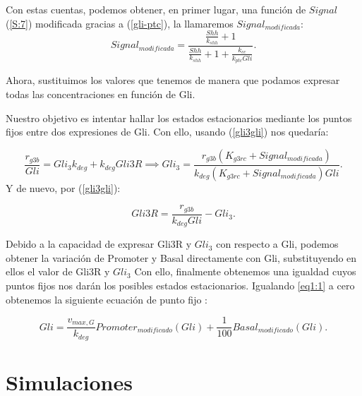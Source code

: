 Con estas cuentas, podemos obtener, en primer lugar, una función de $Signal$ (\ref{S:7}) modificada gracias a (\ref{gli-ptc}), la llamaremos $Signal_{modificada}$:
\begin{equation}
Signal_{modificada}=\frac{\frac{Shh}{k_{shh}} + 1}{\frac{Shh}{k_{shh}} + 1 + \frac{k_{cc}}{k_{ptc}Gli}}.
\end{equation}

Ahora, sustituimos los valores que tenemos de manera que podamos expresar todas las concentraciones en función de Gli. 

Nuestro objetivo es intentar hallar los estados estacionarios mediante los puntos fijos entre dos expresiones de Gli. Con ello, usando (\ref{gli3gli}) nos quedaría:

\begin{equation}
 \frac{r_{g3b}}{Gli}=Gli_3k_{deg}+k_{deg}Gli3R
 \implies Gli_3=\frac{r_{g3b}(K_{g3rc}+Signal_{modificada})}{k_{deg}(K_{g3rc}+Signal_{modificada})Gli}.
\label{equgli3}
\end{equation}
 Y de nuevo, por  (\ref{gli3gli}):
 
 \begin{equation}
 Gli3R=\frac{r_{g3b}}{k_{deg}Gli}-Gli_3.
 \label{equgli3r}
 \end{equation}

Debido a la capacidad de expresar Gli3R y $Gli_3$ con respecto a Gli, podemos obtener la variación de Promoter y Basal directamente con Gli, substituyendo en ellos el valor de Gli3R y $Gli_3$
Con ello, finalmente obtenemos una igualdad cuyos puntos fijos nos darán los posibles estados estacionarios. Igualando \ref{eq1:1} a cero obtenemos la siguiente ecuación de punto fijo :

 \begin{equation}
 Gli=\frac{v_{max,G}}{k_{deg}}Promoter_{modificado}(Gli)+\frac{1}{100}Basal_{modificado}(Gli).
 \label{final_gli}
 \end{equation}


\section{Simulaciones}

